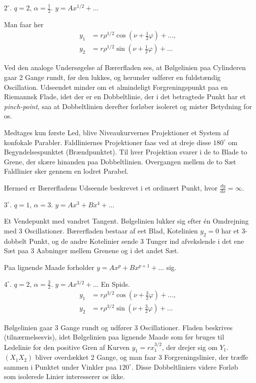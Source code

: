 \documentclass{article}
\begin{document}
$2^\circ$. $q = 2$, $\alpha = \frac{1}{2}$. $y = A x^{1/2} + \dots$

Man faar her
\[
\begin{aligned}
y_1 &= r \rho^{1/2} \cos \left(\nu + \frac{1}{2}\varphi\right) + \dots, \\
y_2 &= r \rho^{1/2} \sin \left(\nu + \frac{1}{2}\varphi\right) + \dots
\end{aligned}
\]

Ved den analoge Undersøgelse af Bærerfladen ses, at Bølgelinien paa Cylinderen gaar 2 Gange rundt, før den lukkes, og herunder udfører en fuldstændig Oscillation. Udseendet minder om et almindeligt Forgreningspunkt paa en Riemannsk Flade, idet der er en Dobbeltlinie, der i det betragtede Punkt har et \emph{pinch-point}, saa at Dobbeltlinien derefter forløber isoleret og mister Betydning for os.

Medtages kun første Led, blive Niveaukurvernes Projektioner et System af konfokale Parabler. Faldliniernes Projektioner faas ved at dreje disse $180^\circ$ om Begyndelsespunktet (Brændpunktet). Til hver Projektion svarer i de to Blade to Grene, der skære hinanden paa Dobbeltlinien. Overgangen mellem de to Sæt Faldlinier sker gennem en lodret Parabel.

Hermed er Bærerfladens Udseende beskrevet i et ordinært Punkt, hvor $\frac{dy}{dx} = \infty$.

$3^\circ$. $q = 1$, $\alpha = 3$. $y = A x^3 + B x^4 + \dots$

Et Vendepunkt med vandret Tangent. Bølgelinien lukker sig efter én Omdrejning med 3 Oscillationer. Bærerfladen bestaar af eet Blad, Kotelinien $y_2 = 0$ har et 3-dobbelt Punkt, og de andre Kotelinier sende 3 Tunger ind afvekslende i det ene Sæt paa 3 Aabninger mellem Grenene og i det andet Sæt.

Paa lignende Maade forholder $y = A x^p + B x^{p+1} + \dots$ sig.

$4^\circ$. $q = 2$, $\alpha = \frac{3}{2}$. $y = A x^{3/2} + \dots$ En Spids.
\[
\begin{aligned}
y_1 &= r \rho^{3/2} \cos \left(\nu + \frac{3}{2}\varphi\right) + \dots, \\
y_2 &= r \rho^{3/2} \sin \left(\nu + \frac{3}{2}\varphi\right) + \dots
\end{aligned}
\]

Bølgelinien gaar 3 Gange rundt og udfører 3 Oscillationer. Fladen beskrives (tilnærmelsesvis), idet Bølgelinien paa lignende Maade som før bruges til Ledelinie for den positive Gren af Kurven $y_1 = r x_1^{3/2}$, der drejer sig om $Y_1$. $(X_1 X_2)$ bliver overdækket 2 Gange, og man faar 3 Forgreningslinier, der træffe sammen i Punktet under Vinkler paa $120^\circ$. Disse Dobbeltliniers videre Forløb som isolerede Linier interesserer os ikke.
\end{document}
